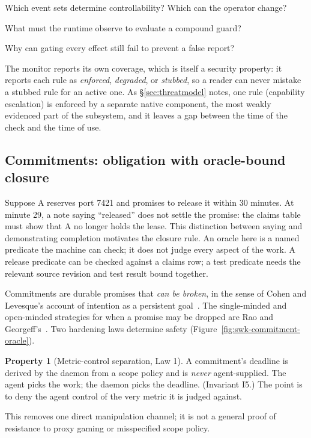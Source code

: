 \documentclass[11pt,a4paper]{article}
\theoremstyle{definition}
\newtheorem{property}{Property}[section]
\theoremstyle{remark}
\begin{document}
\begin{pdrecitation}
\item Which event sets determine controllability? Which can the operator change?
\item What must the runtime observe to evaluate a compound guard?
\item Why can gating every effect still fail to prevent a false report?
\end{pdrecitation}

The monitor reports its own coverage, which is itself a security property: it
reports each rule as \emph{enforced}, \emph{degraded}, or \emph{stubbed}, so a
reader can never mistake a stubbed rule for an active one. As
\S\ref{sec:threatmodel} notes, one rule (capability escalation) is enforced by a
separate native component, the most weakly evidenced part of the subsystem, and
it leaves a gap between the time of the check and the time of use.


\ifdefined\pdbookfontprofile
\fi

\subsection{Commitments: obligation with oracle-bound closure}



Suppose A reserves port 7421 and promises to release it within 30 minutes.
At minute 29, a note saying ``released'' does not settle the promise: the
claims table must show that A no longer holds the lease. This distinction
between saying and demonstrating completion motivates the closure rule.
An oracle here is a named predicate the machine can check; it does not judge
every aspect of the work. A release predicate can be
checked against a claims row; a test predicate needs the relevant source
revision and test result bound together.

Commitments are durable promises that \emph{can be broken}, in the sense of Cohen and
Levesque's account of intention as a persistent goal~.
The single-minded and open-minded strategies for when a promise may be dropped are
Rao and Georgeff's~. Two
hardening laws determine safety (Figure~\ref{fig:swk-commitment-oracle}).

\begin{property}[Metric-control separation, Law 1]\label{prop:law1}
\setlength{\parskip}{4pt plus 1pt}
A commitment's deadline is derived by the daemon from a scope policy and is
\emph{never} agent-supplied. The agent picks the work; the daemon picks the
deadline. (Invariant I5.) The point is to deny the agent control of the very metric
it is judged against.

This removes one direct manipulation channel; it is not a
general proof of resistance to proxy gaming or misspecified scope policy.
\end{property}
\end{document}
